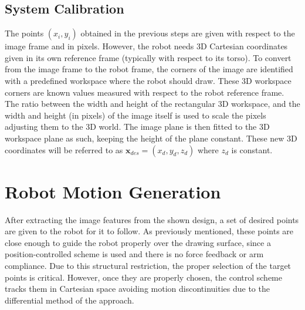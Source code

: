 \documentclass[conference]{IEEEtran}
\newcommand{\x}{\mathbf x}
\begin{document}

\subsection{System Calibration}

The points $(x_i,y_i)$ obtained in the previous steps are given with respect to the image frame and in pixels. However, the robot needs 3D Cartesian coordinates given in its own reference frame \cite{singh2015sketch} (typically with respect to its torso). To convert from the image frame to the robot frame, the corners of the image are identified with a predefined workspace where the robot should draw. These 3D workspace corners are known values measured with respect to the robot reference frame. The ratio between the width and height of the rectangular 3D workspace, and the width and height (in pixels) of the image itself is used to scale the pixels adjusting them to the 3D world. The image plane is then fitted to the 3D workspace plane as such, keeping the height of the plane constant. These new 3D coordinates will be referred to as $\x_{des} = (x_d, y_d, z_d)$ where $z_d$ is constant.

\section{Robot Motion Generation}
\label{sec:robot-motion}

After extracting the image features from the shown design, a set of desired points are given to the robot for it to follow. As previously mentioned, these points are close enough to guide the robot properly over the drawing surface, since a position-controlled scheme is used and there is no force feedback or arm compliance. Due to this structural restriction, the proper selection of the target points is critical. However, once they are properly chosen, the control scheme tracks them in Cartesian space avoiding motion discontinuities due to the differential method of the approach.
\end{document}
